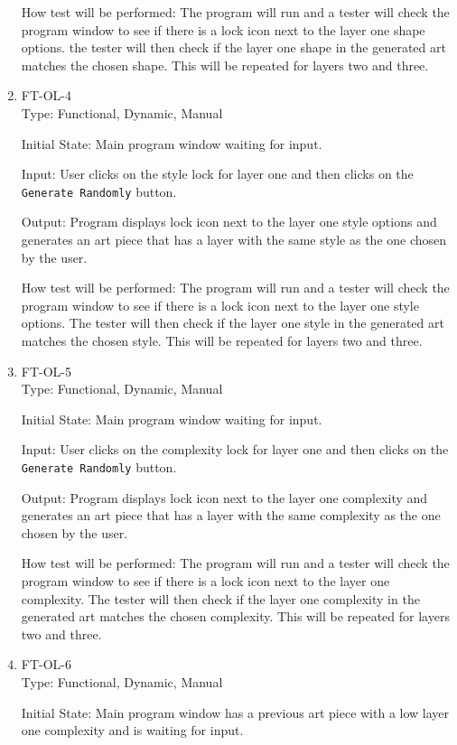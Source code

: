 \documentclass[12pt, titlepage]{article}
\begin{document}
\begin{enumerate}
How test will be performed: The program will run and a tester will check the program window to see if there is a lock icon next to the layer one shape options. the tester will then check if the layer one shape in the generated art matches the chosen shape. This will be repeated for layers two and three.

\item{FT-OL-4\\}
Type: Functional, Dynamic, Manual

Initial State: Main program window waiting for input. %

Input: User clicks on the style lock for layer one and then clicks on the \texttt{Generate Randomly} button.

Output: Program displays lock icon next to the layer one style options and generates an art piece that has a layer with the same style as the one chosen by the user.

How test will be performed: The program will run and a tester will check the program window to see if there is a lock icon next to the layer one style options. The tester will then check if the layer one style in the generated art matches the chosen style. This will be repeated for layers two and three.

\item{FT-OL-5\\}
Type: Functional, Dynamic, Manual

Initial State: Main program window waiting for input. %

Input: User clicks on the complexity lock for layer one and then clicks on the \texttt{Generate Randomly} button.

Output: Program displays lock icon next to the layer one complexity and generates an art piece that has a layer with the same complexity as the one chosen by the user.

How test will be performed: The program will run and a tester will check the program window to see if there is a lock icon next to the layer one complexity. The tester will then check if the layer one complexity in the generated art matches the chosen complexity. This will be repeated for layers two and three.

\item{FT-OL-6\\}
Type: Functional, Dynamic, Manual

Initial State: Main program window has a previous art piece with a low layer one complexity and is waiting for input. %


\end{enumerate}
\end{document}
